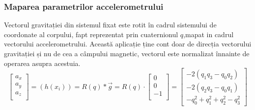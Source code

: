 \subsubsection{Maparea parametrilor accelerometrului}
\-\hspace{1cm}Vectorul gravitației din sistemul fixat este rotit în cadrul sistemului de coordonate al corpului, fapt reprezentat prin cuaternionul $q$,mapat in cadrul vectorului accelerometrului. Această aplicație ține cont doar de direcția vectorului gravitației și nu de cea a câmpului magnetic, vectorul este normalizat înnainte de operarea asupra acestuia.
\begin{equation}
\begin{bmatrix}
a_x \\  
a_y \\ 
a_z \\
\end{bmatrix}
=(h(x_i))=R(q)* \overrightarrow{g}=
R(q) \cdot
\begin{bmatrix}
0 \\  
0\\ 
-1 \\
\end{bmatrix}
=
\begin{bmatrix}
-2(q_1q_3-q_0q_2) \\  
-2(q_2q_3-q_0q_1)\\ 
-q_0^2+q_1^2+q_2^2-q_3^2
\end{bmatrix}
\end{equation}

